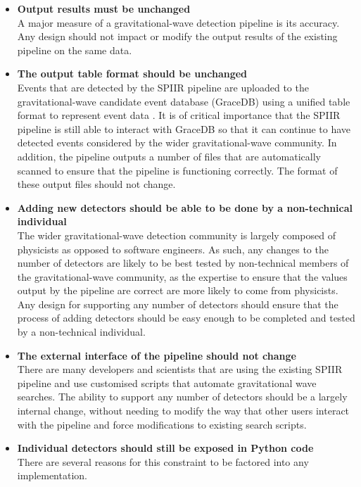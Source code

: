 \documentclass{article}
\begin{document}
\begin{itemize}
    \item \textbf{Output results must be unchanged}\\
        A major measure of a gravitational-wave detection pipeline is its accuracy.
        Any design should not impact or modify the output results of the existing pipeline on the same data.
    \item \textbf{The output table format should be unchanged}\\
        Events that are detected by the SPIIR pipeline are uploaded to the gravitational-wave candidate event database (GraceDB) using a unified table format to represent event data \cite{gracedb}.
        It is of critical importance that the SPIIR pipeline is still able to interact with GraceDB so that it can continue to have detected events considered by the wider gravitational-wave community.
        In addition, the pipeline outputs a number of files that are automatically scanned to ensure that the pipeline is functioning correctly.
        The format of these output files should not change.
    \item \textbf{Adding new detectors should be able to be done by a non-technical individual}\\
        The wider gravitational-wave detection community is largely composed of physicists as opposed to software engineers.
        As such, any changes to the number of detectors are likely to be best tested by non-technical members of the gravitational-wave community, as the expertise to ensure that the values output by the pipeline are correct are more likely to come from physicists.
        Any design for supporting any number of detectors should ensure that the process of adding detectors should be easy enough to be completed and tested by a non-technical individual.
    \item \textbf{The external interface of the pipeline should not change}\\
        There are many developers and scientists that are using the existing SPIIR pipeline and use customised scripts that automate gravitational wave searches.
        The ability to support any number of detectors should be a largely internal change, without needing to modify the way that other users interact with the pipeline and force modifications to existing search scripts.
    \item \textbf{Individual detectors should still be exposed in Python code}\\
        There are several reasons for this constraint to be factored into any implementation.

\end{itemize}
\end{document}
